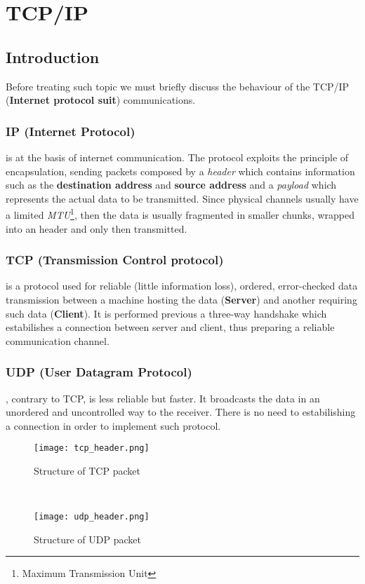 \documentclass[../../main.tex]{subfiles}
\begin{document}
    

\section{TCP/IP}
\subsection{Introduction}
Before treating such topic we must briefly discuss the behaviour of the
TCP/IP (\textbf{Internet protocol suit}) communications.

\subsubsection{IP (Internet Protocol)} is at the basis of internet
communication. The protocol exploits the principle of encapsulation, sending
packets composed by a \emph{header} which contains information such as the
\textbf{destination address} and \textbf{source address} and a
\emph{payload} which represents the actual data to be transmitted.
Since physical channels usually have a limited \emph{MTU}\footnote{Maximum
Transmission Unit}, then the data is usually fragmented in smaller chunks,
wrapped into an header and only then transmitted.

\subsubsection{TCP (Transmission Control protocol)} is a protocol used for
reliable (little information loss), ordered, error-checked data transmission
between a machine hosting the data (\textbf{Server}) and another requiring
such data (\textbf{Client}). It is performed previous a three-way handshake
which estabilishes a connection between server and client, thus preparing a
reliable communication channel.

\subsubsection{UDP (User Datagram Protocol)}, contrary to TCP, is less reliable
but faster.
It broadcasts the data in an unordered and uncontrolled way to the receiver. 
There is no need to estabilishing a connection in order to implement such
protocol.

\begin{figure*}[h]
    \centering
    \begin{subfigure}{.45\textwidth}
        \centering
        \texttt{[image: tcp\_header.png]}
        \caption{Structure of TCP packet}
    \end{subfigure}%
    ~
    \begin{subfigure}{.45\textwidth}
        \centering
        \texttt{[image: udp\_header.png]}
        \caption{Structure of UDP packet}
    \end{subfigure}
\end{figure*}
\end{document}
